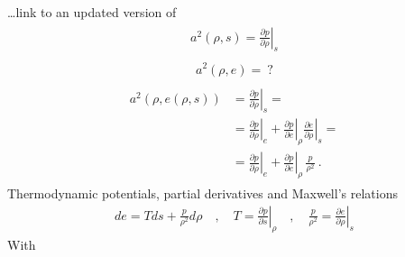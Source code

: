 \documentclass[letterpaper,10pt,english]{jupyterBook}
\begin{document}
\sphinxAtStartPar
…link to an updated version of 
\begin{equation*}
\begin{split}\begin{aligned}
  a^2(\rho,s) = \left.\frac{\partial p}{\partial \rho}\right|_s 
\end{aligned}\end{split}
\end{equation*}
\sphinxAtStartPar
{}
\begin{equation*}
\begin{split}\begin{aligned}
  a^2(\rho, e) = \ ?
\end{aligned}\end{split}
\end{equation*}\begin{equation*}
\begin{split}\begin{aligned}
  a^2(\rho, e(\rho, s)) 
  & = \left.\frac{\partial p}{\partial \rho}\right|_s  = \\
  & = \left.\frac{\partial p}{\partial \rho}\right|_e + \left.\frac{\partial p}{\partial e}\right|_\rho \left.\frac{\partial e}{\partial \rho}\right|_s  = \\
  & = \left.\frac{\partial p}{\partial \rho}\right|_e + \left.\frac{\partial p}{\partial e}\right|_\rho \, \frac{p}{\rho^2} \ .
\end{aligned}\end{split}
\end{equation*}
\sphinxAtStartPar
Thermodynamic potentials, partial derivatives and Maxwell’s relations
\begin{equation*}
\begin{split}
de = T ds + \frac{p}{\rho^2} d \rho
\quad , \quad
T = \left.\frac{\partial p}{\partial s}\right|_\rho
\quad , \quad
\frac{p}{\rho^2} = \left.\frac{\partial e}{\partial \rho}\right|_s
\end{split}
\end{equation*}
\sphinxAtStartPar
{} With
\end{document}

